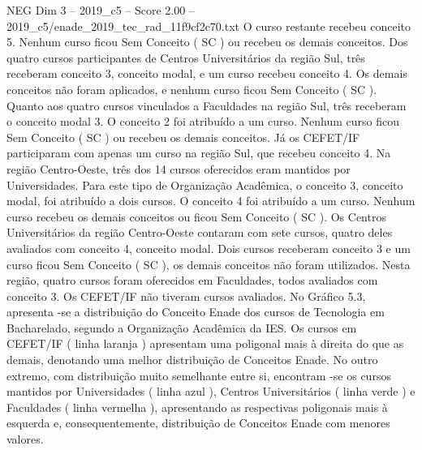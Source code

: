\begin{textsample}{NEG Dim 3 – 2019\_c5 – Score 2.00 – 2019\_c5/enade\_2019\_tec\_rad\_11f9cf2c70.txt}
O curso restante recebeu conceito 5.
Nenhum curso ficou Sem Conceito ( SC ) ou recebeu os demais conceitos.
Dos quatro cursos participantes de Centros Universitários da região Sul, três receberam conceito 3, conceito modal, e um curso recebeu conceito 4.
Os demais conceitos não foram aplicados, e nenhum curso ficou Sem Conceito ( SC ).
Quanto aos quatro cursos vinculados a Faculdades na região Sul, três receberam o conceito modal 3.
O conceito 2 foi atribuído a um curso.
Nenhum curso ficou Sem Conceito ( SC ) ou recebeu os demais conceitos.
Já os CEFET/IF participaram com apenas um curso na região Sul, que recebeu conceito 4.
Na região Centro-Oeste, três dos 14 cursos oferecidos eram mantidos por Universidades.
Para este tipo de Organização Acadêmica, o conceito 3, conceito modal, foi atribuído a dois cursos.
O conceito 4 foi atribuído a um curso.
Nenhum curso recebeu os demais conceitos ou ficou Sem Conceito ( SC ).
Os Centros Universitários da região Centro-Oeste contaram com sete cursos, quatro deles avaliados com conceito 4, conceito modal.
Dois cursos receberam conceito 3 e um curso ficou Sem Conceito ( SC ), os demais conceitos não foram utilizados.
Nesta região, quatro cursos foram oferecidos em Faculdades, todos avaliados com conceito 3.
Os CEFET/IF não tiveram cursos avaliados.
No Gráfico 5.3, apresenta -se a distribuição do Conceito Enade dos cursos de Tecnologia em Bacharelado, segundo a Organização Acadêmica da IES.
Os cursos em CEFET/IF ( linha laranja ) apresentam uma poligonal mais à direita do que as demais, denotando uma melhor distribuição de Conceitos Enade.
No outro extremo, com distribuição muito semelhante entre si, encontram -se os cursos mantidos por Universidades ( linha azul ), Centros Universitários ( linha verde ) e Faculdades ( linha vermelha ), apresentando as respectivas poligonais mais à esquerda e, consequentemente, distribuição de Conceitos Enade com menores valores.

\end{textsample}
